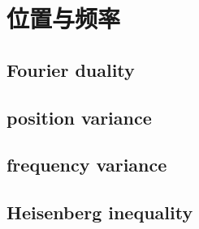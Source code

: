 \section{位置与频率}
\label{b2:sec:2001}


\subsection{Fourier duality}
\label{b2:subsec:200101}

\subsection{position variance}
\label{b2:subsec:200102}

\subsection{frequency variance}
\label{b2:subsec:200103}

\subsection{Heisenberg inequality}
\label{b2:subsec:200104}


